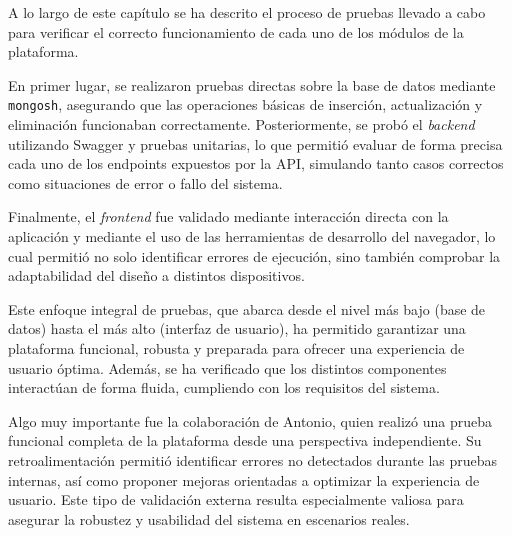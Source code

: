 A lo largo de este capítulo se ha descrito el proceso de pruebas llevado a cabo para verificar el correcto funcionamiento de cada uno de los módulos de la plataforma.

En primer lugar, se realizaron pruebas directas sobre la base de datos mediante \texttt{mongosh}, asegurando que las operaciones básicas de inserción, actualización y eliminación funcionaban correctamente. Posteriormente, se probó el \textit{backend} utilizando Swagger y pruebas unitarias, lo que permitió evaluar de forma precisa cada uno de los endpoints expuestos por la API, simulando tanto casos correctos como situaciones de error o fallo del sistema.

Finalmente, el \textit{frontend} fue validado mediante interacción directa con la aplicación y mediante el uso de las herramientas de desarrollo del navegador, lo cual permitió no solo identificar errores de ejecución, sino también comprobar la adaptabilidad del diseño a distintos dispositivos.

Este enfoque integral de pruebas, que abarca desde el nivel más bajo (base de datos) hasta el más alto (interfaz de usuario), ha permitido garantizar una plataforma funcional, robusta y preparada para ofrecer una experiencia de usuario óptima. Además, se ha verificado que los distintos componentes interactúan de forma fluida, cumpliendo con los requisitos del sistema.

Algo muy importante fue la colaboración de Antonio, quien realizó una prueba funcional completa de la plataforma desde una perspectiva independiente. Su retroalimentación permitió identificar errores no detectados durante las pruebas internas, así como proponer mejoras orientadas a optimizar la experiencia de usuario. Este tipo de validación externa resulta especialmente valiosa para asegurar la robustez y usabilidad del sistema en escenarios reales.
